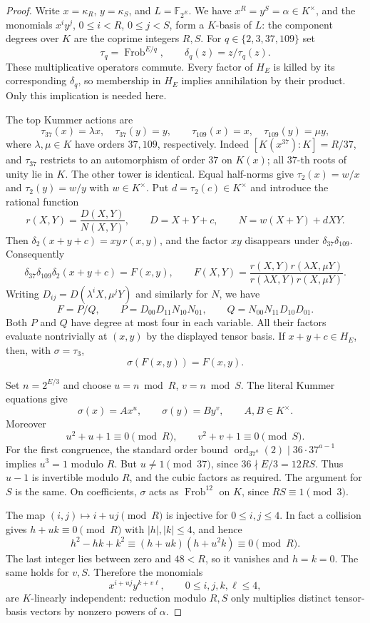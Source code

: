 \documentclass[11pt]{article}
\theoremstyle{definition}
\theoremstyle{remark}
\begin{document}
\begin{proof}
Write $x=\kappa_R$, $y=\kappa_S$, and $L=\mathbb F_{2^E}$.  We have
$x^R=y^S=\alpha\in K^\times$, and the monomials
$x^iy^j$, $0\leq i<R$, $0\leq j<S$, form a $K$-basis of $L$:
the component degrees over $K$ are the coprime integers $R,S$.
For $q\in\{2,3,37,109\}$ set
\[
 \tau_q=\operatorname{Frob}^{E/q},\qquad
 \delta_q(z)=z/\tau_q(z).
\]
These multiplicative operators commute.  Every factor of $H_E$ is killed
by its corresponding $\delta_q$, so membership in $H_E$ implies
annihilation by their product.  Only this implication is needed here.

The top Kummer actions are
\[
 \tau_{37}(x)=\lambda x,\quad \tau_{37}(y)=y,
 \qquad
 \tau_{109}(x)=x,\quad \tau_{109}(y)=\mu y,
\]
where $\lambda,\mu\in K$ have orders $37,109$, respectively.
Indeed $[K(x^{37}):K]=R/37$, and $\tau_{37}$ restricts to an
automorphism of order $37$ on $K(x)$; all $37$-th roots of unity lie in
$K$.  The other tower is identical.  Equal half-norms give
$\tau_2(x)=w/x$ and $\tau_2(y)=w/y$ with $w\in K^\times$.
Put $d=\tau_2(c)\in K^\times$ and introduce the rational function
\[
 r(X,Y)=\frac{D(X,Y)}{N(X,Y)},\qquad
 D=X+Y+c,\qquad N=w(X+Y)+dXY.
\]
Then $\delta_2(x+y+c)=xy\,r(x,y)$, and the factor $xy$ disappears
under $\delta_{37}\delta_{109}$.  Consequently
\[
 \delta_{37}\delta_{109}\delta_2(x+y+c)=F(x,y),\qquad
 F(X,Y)=\frac{r(X,Y)r(\lambda X,\mu Y)}
                  {r(\lambda X,Y)r(X,\mu Y)}.
\]
Writing $D_{ij}=D(\lambda^iX,\mu^jY)$ and similarly for $N$, we have
\[
 F=P/Q,\qquad
 P=D_{00}D_{11}N_{10}N_{01},\qquad
 Q=N_{00}N_{11}D_{10}D_{01}.
\]
Both $P$ and $Q$ have degree at most four in each variable.  All their
factors evaluate nontrivially at $(x,y)$ by the displayed tensor basis.
If $x+y+c\in H_E$, then, with $\sigma=\tau_3$,
\[
 \sigma(F(x,y))=F(x,y).
\]

Set $n=2^{E/3}$ and choose $u=n\bmod R$, $v=n\bmod S$.  The literal
Kummer equations give
\[
 \sigma(x)=Ax^u,\qquad \sigma(y)=By^v,\qquad A,B\in K^\times.
\]
Moreover
\[
 u^2+u+1\equiv0\pmod R,\qquad
 v^2+v+1\equiv0\pmod S.
\]
For the first congruence, the standard order bound
$\operatorname{ord}_{37^a}(2)\mid36\cdot37^{a-1}$ implies $u^3=1$
modulo $R$.  But $u\ne1\pmod{37}$, since $36\nmid E/3=12RS$.
Thus $u-1$ is invertible modulo $R$, and the cubic factors as required.
The argument for $S$ is the same.  On coefficients, $\sigma$ acts as
$\operatorname{Frob}^{12}$ on $K$, since $RS\equiv1\pmod3$.

The map $(i,j)\mapsto i+uj\pmod R$ is injective for $0\leq i,j\leq4$.
In fact a collision gives $h+uk\equiv0\pmod R$ with $|h|,|k|\leq4$,
and hence
\[
 h^2-hk+k^2\equiv(h+uk)(h+u^2k)\equiv0\pmod R.
\]
The last integer lies between zero and $48<R$, so it vanishes and
$h=k=0$.  The same holds for $v,S$.  Therefore the monomials
\[
 x^{i+uj}y^{k+v\ell},\qquad 0\leq i,j,k,\ell\leq4,
\]
are $K$-linearly independent: reduction modulo $R,S$ only multiplies
distinct tensor-basis vectors by nonzero powers of $\alpha$.


\end{proof}
\end{document}
